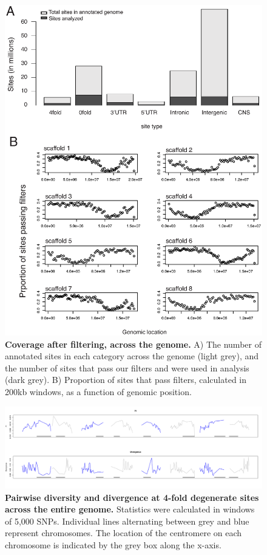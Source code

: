 \begin{figure}[h!]
      \centering
       \includegraphics[width=\linewidth]{Ch2FigS1}
    \caption{\textbf{Coverage after filtering, across the genome.} A) The number of annotated sites in each category across the genome (light grey), and the number of sites that pass our filters and were used in analysis (dark grey). B) Proportion of sites that pass filters, calculated in 200kb windows, as a function of genomic position.}
    \label{fig:figS1}
\end{figure}

\begin{figure}[h!]
      \centering
       \includegraphics[width=\linewidth]{Ch2FigS2.pdf}
    \caption{\textbf{Pairwise diversity and divergence at 4-fold degenerate sites across the entire genome.} Statistics were calculated in windows of 5,000 SNPs. Individual lines alternating between grey and blue represent chromosomes. The location of the centromere on each chromosome is indicated by the grey box along the x-axis.}
    \label{fig:figS2}
\end{figure}

